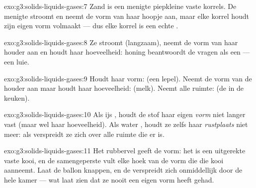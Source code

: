 \begin{solution}{exo:g3:solids-liquids-gases:7}
Zand is een menigte piepkleine vaste korrels. De menigte stroomt en
neemt de vorm van haar hoopje aan, maar elke korrel houdt zijn eigen
vorm volmaakt --- dus elke korrel is een echte .
\end{solution}

\begin{solution}{exo:g3:solids-liquids-gases:8}
Ze stroomt (langzaam), neemt de vorm van haar houder aan en houdt haar
hoeveelheid: honing beantwoordt de vragen als een  --- een
luie.
\end{solution}

\begin{solution}{exo:g3:solids-liquids-gases:9}
Houdt haar vorm:  (een lepel). Neemt de vorm van de houder
aan maar houdt haar hoeveelheid:  (melk). Neemt alle ruimte:
 (de  in de keuken).
\end{solution}

\begin{solution}{exo:g3:solids-liquids-gases:10}
Als ijs , houdt de stof haar eigen \emph{vorm} niet langer vast
(maar wel haar hoeveelheid). Als water , houdt ze zelfs haar
\emph{rustplaats} niet meer: als  verspreidt ze zich over alle
ruimte die er is.
\end{solution}

\begin{solution}{exo:g3:solids-liquids-gases:11}
Het rubbervel geeft de vorm: het is een uitgerekte vaste kooi, en de
samengeperste  vult elke hoek van de vorm die die kooi aanneemt.
Laat de ballon knappen, en de  verspreidt zich onmiddellijk door de
hele kamer --- wat laat zien dat ze nooit een eigen vorm heeft gehad.
\end{solution}
